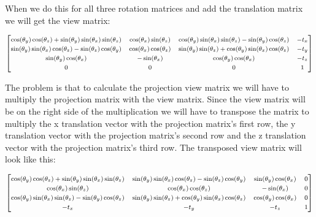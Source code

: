 \documentclass[12pt]{report} \usepackage{preamble}
\begin{document}
When we do this for all three rotation matrices and add the translation matrix we will get the view matrix:

\[
	\fontsize{8}{12}\selectfont
	\begin{bmatrix}
		\cos(\theta_y) \cos(\theta_z) + \sin(\theta_y) \sin(\theta_x) \sin(\theta_z) & \cos(\theta_x) \sin(\theta_z) & \cos(\theta_y) \sin(\theta_x) \sin(\theta_z) - \sin(\theta_y) \cos(\theta_z) & -t_x \\
		\sin(\theta_y) \sin(\theta_x) \cos(\theta_z) - \sin(\theta_z) \cos(\theta_y) & \cos(\theta_x) \cos(\theta_z) & \sin(\theta_y) \sin(\theta_z) + \cos(\theta_y) \sin(\theta_x) \cos(\theta_z) & -t_y \\
		\sin(\theta_y) \cos(\theta_x)                                                & -\sin(\theta_x)               & \cos(\theta_y) \cos(\theta_x)                                                & -t_z \\
		0                                                                            & 0                             & 0                                                                            & 1    \\
	\end{bmatrix}
\]

The problem is that to calculate the projection view matrix we will have to multiply the projection matrix with the view matrix.
Since the view matrix will be on the right side of the multiplication we will have to transpose the matrix to multiply the x translation vector with the projection matrix's first row,
the y translation vector with the projection matrix's second row and the z translation vector with the projection matrix's third row.
The transposed view matrix will look like this:

\[
	\fontsize{8}{12}\selectfont
	\begin{bmatrix}
		\cos(\theta_y) \cos(\theta_z) + \sin(\theta_y) \sin(\theta_x) \sin(\theta_z) & \sin(\theta_y) \sin(\theta_x) \cos(\theta_z) - \sin(\theta_z) \cos(\theta_y) & \sin(\theta_y) \cos(\theta_x) & 0 \\
		\cos(\theta_x) \sin(\theta_z)                                                & \cos(\theta_x) \cos(\theta_z)                                                & -\sin(\theta_x)               & 0 \\
		\cos(\theta_y) \sin(\theta_x) \sin(\theta_z) - \sin(\theta_y) \cos(\theta_z) & \sin(\theta_y) \sin(\theta_z) + \cos(\theta_y) \sin(\theta_x) \cos(\theta_z) & \cos(\theta_y) \cos(\theta_x) & 0 \\
		-t_x                                                                         & -t_y                                                                         & -t_z                          & 1 \\
	\end{bmatrix}
\]
\end{document}
